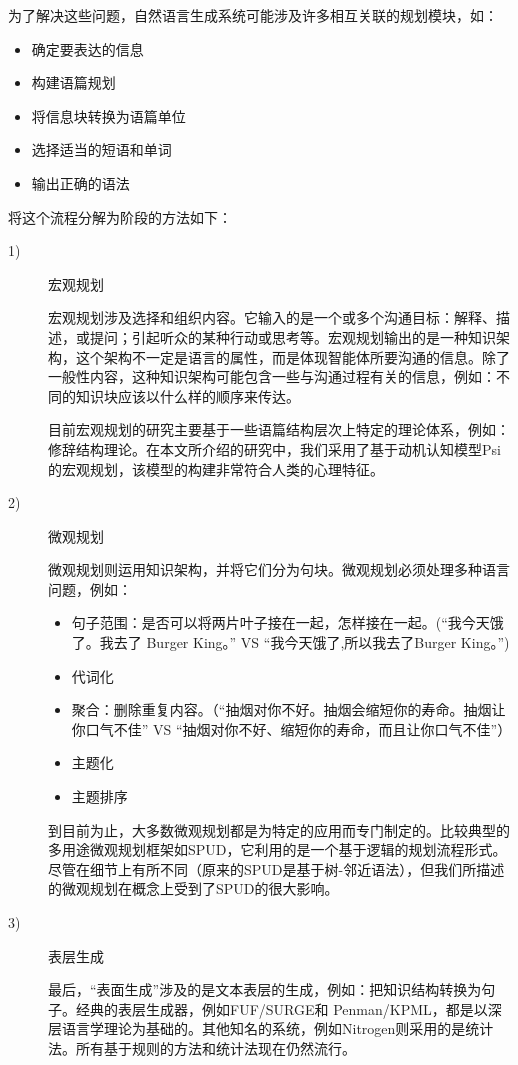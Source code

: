 \begin{enumerate}
为了解决这些问题，自然语言生成系统可能涉及许多相互关联的规划模块，如：
\begin{itemize}
\item 确定要表达的信息
\item 构建语篇规划
\item 将信息块转换为语篇单位
\item 选择适当的短语和单词
\item 输出正确的语法
\end{itemize}

将这个流程分解为阶段的方法如下：
\begin{description}

\item [1)] 宏观规划

宏观规划涉及选择和组织内容。它输入的是一个或多个沟通目标：解释、描述，或提问；引起听众的某种行动或思考等。宏观规划输出的是一种知识架构，这个架构不一定是语言的属性，而是体现智能体所要沟通的信息。除了一般性内容，这种知识架构可能包含一些与沟通过程有关的信息，例如：不同的知识块应该以什么样的顺序来传达。

目前宏观规划的研究主要基于一些语篇结构层次上特定的理论体系，例如：修辞结构理论\cite{Mann1987}。在本文所介绍的研究中，我们采用了基于动机认知模型Psi的宏观规划，该模型的构建非常符合人类的心理特征。

\item [2)] 微观规划

微观规划则运用知识架构，并将它们分为句块。微观规划必须处理多种语言问题，例如：

\begin{itemize}
\item 句子范围：是否可以将两片叶子接在一起，怎样接在一起。(“我今天饿了。我去了 Burger King。” VS “我今天饿了,所以我去了Burger King。”)
\item 代词化
\item 聚合：删除重复内容。（“抽烟对你不好。抽烟会缩短你的寿命。抽烟让你口气不佳” VS “抽烟对你不好、缩短你的寿命，而且让你口气不佳”）
\item 主题化
\item 主题排序
\end{itemize}

到目前为止，大多数微观规划都是为特定的应用而专门制定的。比较典型的多用途微观规划框架如SPUD\cite{Stone1997}，它利用的是一个基于逻辑的规划流程形式。尽管在细节上有所不同（原来的SPUD是基于树-邻近语法），但我们所描述的微观规划在概念上受到了SPUD的很大影响。

\item [3)] 表层生成

最后，“表面生成”涉及的是文本表层的生成，例如：把知识结构转换为句子。经典的表层生成器，例如FUF/SURGE\cite{Elhadad1992}和 Penman/KPML\cite{Matthiessen1991}，都是以深层语言学理论为基础的。其他知名的系统，例如Nitrogen\cite{Langkilde1998}则采用的是统计法。所有基于规则的方法和统计法现在仍然流行。

\end{description}

\end{enumerate}

